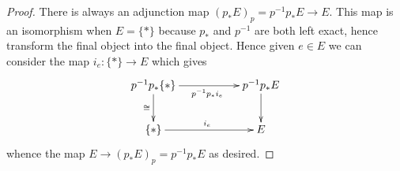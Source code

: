 \documentclass[10pt,a4paper]{amsart}
\theoremstyle{plain}
\theoremstyle{definition}
\theoremstyle{remark}
\numberwithin{equation}{subsection}
\begin{document}
\begin{proof}
There is always an adjunction map $(p_*E)_p = p^{-1}p_*E \to E$.
This map is an isomorphism when $E = \{*\}$ because $p_*$
and $p^{-1}$ are both left exact, hence transform the final
object into the final object. Hence given $e \in E$ we can consider
the map $i_e : \{*\} \to E$ which gives
$$
\xymatrix{
p^{-1}p_*\{*\} \ar[rr]_{p^{-1}p_*i_e} \ar[d]_{\cong} & & p^{-1}p_*E \ar[d] \\
\{*\} \ar[rr]^{i_e} & & E
}
$$
whence the map $E \to (p_*E)_p = p^{-1}p_*E$ as desired.
\end{proof}
\end{document}
